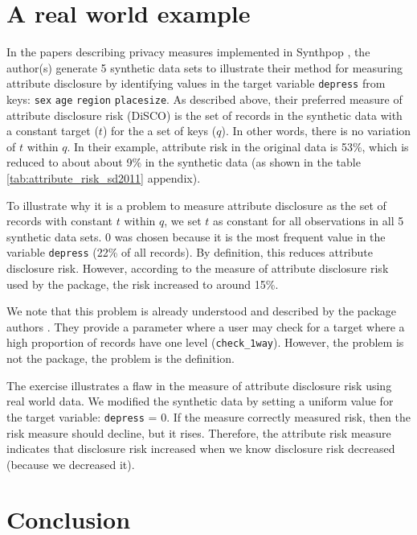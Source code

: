 \documentclass[runningheads]{llncs}
\begin{document}
\section{A real world example}

In the papers describing privacy measures implemented in Synthpop \cite{raab2024privacy,raab2024practical}, the author(s) generate 5 synthetic data sets to illustrate their method for measuring attribute disclosure by identifying values in the target variable \texttt{depress} from keys: \texttt{sex} \texttt{age} \texttt{region} \texttt{placesize}.  As described above, their preferred measure of attribute disclosure risk (DiSCO) is the set of records in the synthetic data with a constant target ($t$) for the a set of keys ($q$).  In other words, there is no variation of $t$ within $q$.  In their example, attribute risk in the original data is 53\%, which is reduced to about about 9\% in the synthetic data (as shown in the table \ref{tab:attribute_risk_sd2011} appendix).  

To illustrate why it is a problem to measure attribute disclosure as the set of records with constant $t$ within $q$, we set $t$ as constant for all observations in all 5 synthetic data sets.  0 was chosen because it is the most frequent value in the variable \texttt{depress} (22\% of all records).  By definition, this reduces attribute disclosure risk.  However, according to the measure of attribute disclosure risk used by the package, the risk increased to around 15\%.

We note that this problem is already understood and described by the package authors \cite{raab2024practical}.  They provide a parameter where a user may check for a target where a high proportion of records have one level (\texttt{check\_1way}).  However, the problem is not the package, the problem is the definition.

The exercise illustrates a flaw in the measure of attribute disclosure risk using real world data.  We modified the synthetic data by setting a uniform value for the target variable: \texttt{depress} = 0.  If the measure correctly measured risk, then the risk measure should decline, but it rises.  Therefore, the attribute risk measure indicates that disclosure risk increased when we know disclosure risk decreased (because we decreased it).  

\section{Conclusion}
\end{document}
